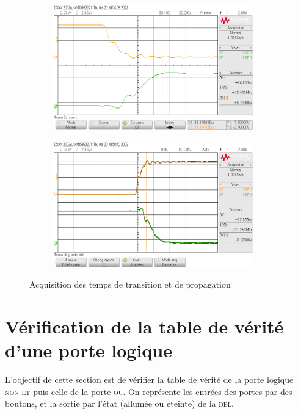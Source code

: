 \documentclass[a4paper,twocolumn,10pt]{report}
\begin{document}
	\begin{figure}[H]
		\centering
		\begin{subfigure}[H]{0.45\textwidth}
			\centering
			\includegraphics[width=0.95\textwidth]{figures/scope_8.png}
			\caption{}
		\end{subfigure}
		\begin{subfigure}[H]{0.45\textwidth}
			\centering
			\includegraphics[width=0.95\textwidth]{figures/scope_6.png}
			\caption{}
		\end{subfigure}
		\caption{Acquisition des temps de transition et de propagation}
	\end{figure}

	\section{Vérification de la table de vérité d'une porte logique}

	L'objectif de cette section est de vérifier la table de vérité de la porte logique \textsc{non-et} puis celle de la porte \textsc{ou}.
	On représente les entrées des portes par des boutons, et la sortie par l'état (allumée ou éteinte) de la \textsc{del}.
	
\end{document}
